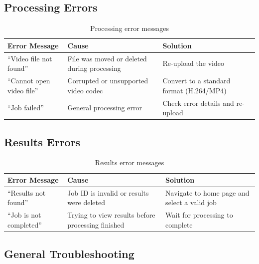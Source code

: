 \subsection{Processing Errors}

\begin{table}[H]
\centering
\small
\begin{tabular}{|p{4cm}|p{4cm}|p{4.5cm}|}
\hline
\textbf{Error Message} & \textbf{Cause} & \textbf{Solution} \\
\hline
``Video file not found'' & File was moved or deleted during processing & Re-upload the video \\
\hline
``Cannot open video file'' & Corrupted or unsupported video codec & Convert to a standard format (H.264/MP4) \\
\hline
``Job failed'' & General processing error & Check error details and re-upload \\
\hline
\end{tabular}
\caption{Processing error messages}
\label{tab:processing-errors}
\end{table}

\subsection{Results Errors}

\begin{table}[H]
\centering
\small
\begin{tabular}{|p{4cm}|p{4cm}|p{4.5cm}|}
\hline
\textbf{Error Message} & \textbf{Cause} & \textbf{Solution} \\
\hline
``Results not found'' & Job ID is invalid or results were deleted & Navigate to home page and select a valid job \\
\hline
``Job is not completed'' & Trying to view results before processing finished & Wait for processing to complete \\
\hline
\end{tabular}
\caption{Results error messages}
\label{tab:results-errors}
\end{table}

\subsection{General Troubleshooting}

